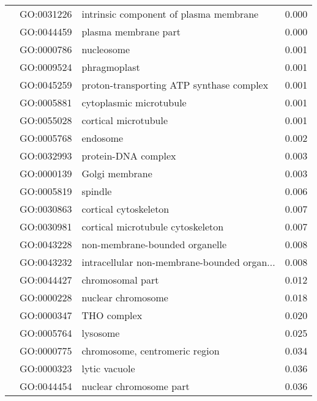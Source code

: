 \begin{longtable}{lllr}
   & GO:0031226 &       intrinsic component of plasma membrane &         0.000 \\
   & GO:0044459 &                         plasma membrane part &         0.000 \\
   & GO:0000786 &                                   nucleosome &         0.001 \\
   & GO:0009524 &                                 phragmoplast &         0.001 \\
   & GO:0045259 &     proton-transporting ATP synthase complex &         0.001 \\
   & GO:0005881 &                      cytoplasmic microtubule &         0.001 \\
   & GO:0055028 &                         cortical microtubule &         0.001 \\
   & GO:0005768 &                                     endosome &         0.002 \\
   & GO:0032993 &                          protein-DNA complex &         0.003 \\
   & GO:0000139 &                               Golgi membrane &         0.003 \\
   & GO:0005819 &                                      spindle &         0.006 \\
   & GO:0030863 &                        cortical cytoskeleton &         0.007 \\
   & GO:0030981 &            cortical microtubule cytoskeleton &         0.007 \\
   & GO:0043228 &               non-membrane-bounded organelle &         0.008 \\
   & GO:0043232 &  intracellular non-membrane-bounded organ... &         0.008 \\
   & GO:0044427 &                             chromosomal part &         0.012 \\
   & GO:0000228 &                           nuclear chromosome &         0.018 \\
   & GO:0000347 &                                  THO complex &         0.020 \\
   & GO:0005764 &                                     lysosome &         0.025 \\
   & GO:0000775 &               chromosome, centromeric region &         0.034 \\
   & GO:0000323 &                                lytic vacuole &         0.036 \\
   & GO:0044454 &                      nuclear chromosome part &         0.036 \\

\end{longtable}
